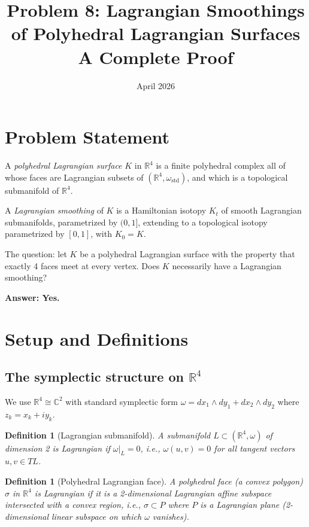 \documentclass[12pt]{article}
\title{Problem 8: Lagrangian Smoothings of Polyhedral Lagrangian Surfaces\\
\large A Complete Proof}
\author{}
\date{April 2026}
\newtheorem{definition}[theorem]{Definition}
\begin{document}
\maketitle

\section{Problem Statement}

A \emph{polyhedral Lagrangian surface} $K$ in $\mathbb{R}^4$ is a finite polyhedral complex all of whose faces are Lagrangian subsets of $(\mathbb{R}^4, \omega_{\mathrm{std}})$, and which is a topological submanifold of $\mathbb{R}^4$.

A \emph{Lagrangian smoothing} of $K$ is a Hamiltonian isotopy $K_t$ of smooth Lagrangian submanifolds, parametrized by $(0,1]$, extending to a topological isotopy parametrized by $[0,1]$, with $K_0 = K$.

The question: let $K$ be a polyhedral Lagrangian surface with the property that exactly 4 faces meet at every vertex. Does $K$ necessarily have a Lagrangian smoothing?

\textbf{Answer: Yes.}

\section{Setup and Definitions}

\subsection{The symplectic structure on $\mathbb{R}^4$}

We use $\mathbb{R}^4 \cong \mathbb{C}^2$ with standard symplectic form $\omega = dx_1 \wedge dy_1 + dx_2 \wedge dy_2$ where $z_k = x_k + iy_k$.

\begin{definition}[Lagrangian submanifold]
A submanifold $L \subset (\mathbb{R}^4, \omega)$ of dimension 2 is \emph{Lagrangian} if $\omega|_L = 0$, i.e., $\omega(u,v) = 0$ for all tangent vectors $u, v \in TL$.
\end{definition}

\begin{definition}[Polyhedral Lagrangian face]
A polyhedral face (a convex polygon) $\sigma$ in $\mathbb{R}^4$ is Lagrangian if it is a 2-dimensional Lagrangian affine subspace intersected with a convex region, i.e., $\sigma \subset P$ where $P$ is a Lagrangian plane (2-dimensional linear subspace on which $\omega$ vanishes).
\end{definition}
\end{document}

